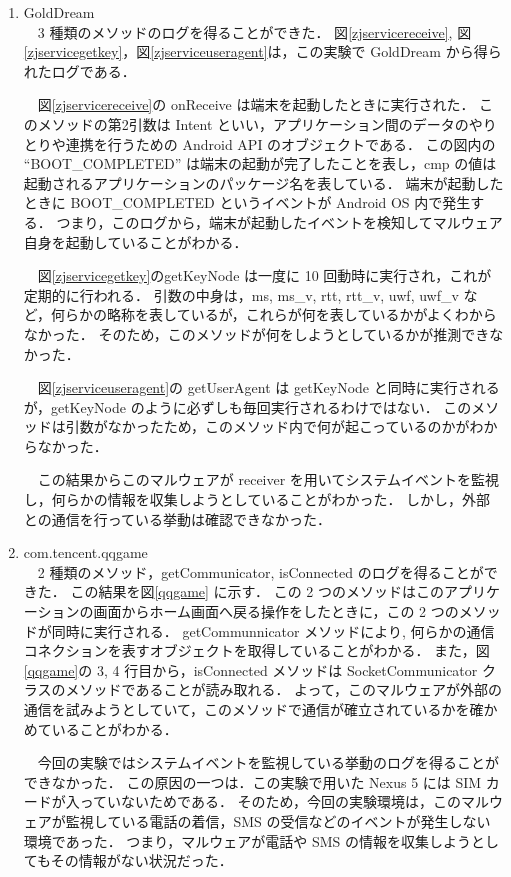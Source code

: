 \begin{enumerate}
\item GoldDream \mbox{}\\
	\ \ 3 種類のメソッドのログを得ることができた．
	図\ref{zjservicereceive}, 図\ref{zjservicegetkey}，図\ref{zjserviceuseragent}は，この実験で GoldDream から得られたログである．
	
	\ \ 図\ref{zjservicereceive}の onReceive は端末を起動したときに実行された．
	このメソッドの第2引数は Intent といい，アプリケーション間のデータのやりとりや連携を行うための Android API のオブジェクトである．
	 この図内の ``BOOT\_COMPLETED'' は端末の起動が完了したことを表し，cmp の値は起動されるアプリケーションのパッケージ名を表している．
	端末が起動したときに BOOT\_COMPLETED というイベントが Android OS 内で発生する．
	つまり，このログから，端末が起動したイベントを検知してマルウェア自身を起動していることがわかる．
	
	\ \ 図\ref{zjservicegetkey}のgetKeyNode は一度に 10 回動時に実行され，これが定期的に行われる．
	引数の中身は，ms, ms\_v, rtt, rtt\_v, uwf, uwf\_v など，何らかの略称を表しているが，これらが何を表しているかがよくわからなかった．
	そのため，このメソッドが何をしようとしているかが推測できなかった．
	
	\ \ 図\ref{zjserviceuseragent}の getUserAgent は getKeyNode と同時に実行されるが，getKeyNode のように必ずしも毎回実行されるわけではない．
	このメソッドは引数がなかったため，このメソッド内で何が起こっているのかがわからなかった．
	
	\ \ この結果からこのマルウェアが receiver を用いてシステムイベントを監視し，何らかの情報を収集しようとしていることがわかった．
	しかし，外部との通信を行っている挙動は確認できなかった．
	
\item com.tencent.qqgame \mbox{}\\
	\ \ 2 種類のメソッド，getCommunicator, isConnected のログを得ることができた．
	この結果を図\ref{qqgame} に示す．
	この 2 つのメソッドはこのアプリケーションの画面からホーム画面へ戻る操作をしたときに，この 2 つのメソッドが同時に実行される．
	getCommunnicator メソッドにより, 何らかの通信コネクションを表すオブジェクトを取得していることがわかる．
	また，図\ref{qqgame}の 3, 4 行目から，isConnected メソッドは SocketCommunicator クラスのメソッドであることが読み取れる．
	よって，このマルウェアが外部の通信を試みようとしていて，このメソッドで通信が確立されているかを確かめていることがわかる．
	
	\ \ 今回の実験ではシステムイベントを監視している挙動のログを得ることができなかった．
	この原因の一つは．この実験で用いた Nexus 5 には SIM カードが入っていないためである．
	そのため，今回の実験環境は，このマルウェアが監視している電話の着信，SMS の受信などのイベントが発生しない環境であった．
	つまり，マルウェアが電話や SMS の情報を収集しようとしてもその情報がない状況だった．
	

\end{enumerate}
